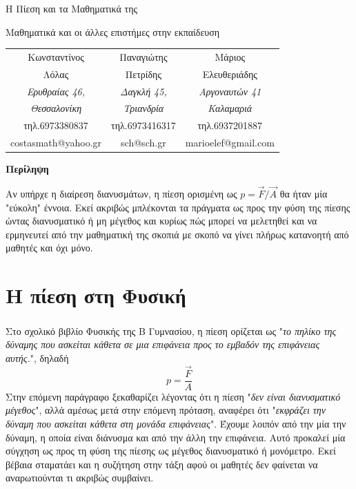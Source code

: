 \documentclass[12pt,titlepage]{article}
\begin{document}
\begin{titlepage}
 \begin{center}
  \Huge {Η Πίεση και τα Μαθηματικά της}

  \vspace{1.5cm}
  \Large {Μαθηματικά και οι άλλες επιστήμες στην εκπαίδευση}
 \end{center}
 \vspace{2cm}
 \begin{center}

  \begin{tabular}{ c c c }
   \Large{Κωνσταντίνος} & \Large{Παναγιώτης} & \Large{Μάριος} \\
   \Large{Λόλας} & \Large{Πετρίδης} & \Large{Ελευθεριάδης} \\
   \textit{Ερυθραίας 46,} & \textit{Δαγκλή 45,} & \textit{Αργοναυτών 41} \\
   \textit{Θεσσαλονίκη} & \textit{Τριανδρία} & \textit{Καλαμαριά} \\
   τηλ.6973380837 & τηλ.6973416317 & τηλ.6937201887 \\
   costasmath@yahoo.gr & sch@sch.gr & marioelef@gmail.com \\
  \end{tabular}

  \vspace{2cm}
  \textbf{Περίληψη}

  Αν υπήρχε η διαίρεση διανυσμάτων, η πίεση ορισμένη ως $p=\vec{F}/\vec{A}$ θα ήταν μία "εύκολη" έννοια. Εκεί ακριβώς μπλέκονται τα πράγματα ως προς την φύση της πίεσης ώντας διανυσματικό ή μη μέγεθος και κυρίως πώς μπορεί να μελετηθεί και να ερμηνευτεί από την μαθηματική της σκοπιά με σκοπό να γίνει πλήρως κατανοητή από μαθητές και όχι μόνο.

 \end{center}

\end{titlepage}

\section{Η πίεση στη Φυσική}
Στο σχολικό βιβλίο Φυσικής της Β Γυμνασίου\textsuperscript{\cite{fysikiB}}, η πίεση ορίζεται ως "\textit{το πηλίκο της δύναμης που ασκείται κάθετα σε μια επιφάνεια προς το εμβαδόν της επιφάνειας αυτής.}", δηλαδή
\begin{equation} \label{eq:1}
 p=\frac{\vec{F}}{A}
\end{equation}
Στην επόμενη παράγραφο ξεκαθαρίζει λέγοντας ότι η πίεση "\textit{δεν είναι διανυσματικό μέγεθος}", αλλά αμέσως μετά στην επόμενη πρόταση, αναφέρει ότι "\textit{εκφράζει την δύναμη που ασκείται κάθετα στη μονάδα επιφάνειας}". Έχουμε λοιπόν από την μία την δύναμη, η οποία είναι διάνυσμα και από την άλλη την επιφάνεια. Αυτό προκαλεί μία σύγχηση ως προς τη φύση της πίεσης ως μέγεθος διανυσματικό ή μονόμετρο. Εκεί βέβαια σταματάει και η συζήτηση στην τάξη αφού οι μαθητές δεν φαίνεται να αναρωτιούνται τι ακριβώς συμβαίνει.
\end{document}
